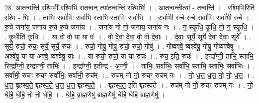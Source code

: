 \documentclass[17pt]{extarticle}
\begin{document}
28. आ॒त॒न्वन्ति॑ र॒श्मिभी॑ र॒श्मिभि॑ रात॒न्वन् त्या॑त॒न्वन्ति॑ र॒श्मिभिः॑ । . आ॒त॒न्वन्तीत्या᳚ - त॒न्वन्ति॑ । . र॒श्मिभि॒रिति॑ र॒श्मि - भिः॒ । . ताभिः॒ सर्वा॑भिः॒ सर्वा॑भि॒ स्ताभि॒ स्ताभिः॒ सर्वा॑भिः । . सर्वा॑भी रु॒चे रु॒चे सर्वा॑भिः॒ सर्वा॑भी रु॒चे । . रु॒चे जना॑य॒ जना॑य रु॒चे रु॒चे जना॑य । . जना॑य नो नो॒ जना॑य॒ जना॑य नः । . न॒ स्कृ॒धि॒ कृ॒धि॒ नो॒ न॒ स्कृ॒धि॒ । . कृ॒धीति॑ कृधि । . या वो॑ वो॒ या या वः॑ । . वो॒ दे॒वा॒ दे॒वा॒ वो॒ वो॒ दे॒वाः॒ । . दे॒वाः॒ सूर्ये॒ सूर्ये॑ देवा देवाः॒ सूर्ये᳚ । . सूर्ये॒ रुचो॒ रुचः॒ सूर्ये॒ सूर्ये॒ रुचः॑ । . रुचो॒ गोषु॒ गोषु॒ रुचो॒ रुचो॒ गोषु॑ । . गोष्वश्वे॒ ष्वश्वे॑षु॒ गोषु॒ गोष्वश्वे॑षु । . अश्वे॑षु॒ या या अश्वे॒ ष्वश्वे॑षु॒ याः । . या रुचो॒ रुचो॒ या या रुचः॑ । . रुच॒ इति॒ रुचः॑ । . इन्द्रा᳚ग्नी॒ ताभि॒ स्ताभि॒ रिन्द्रा᳚ग्नी॒ इन्द्रा᳚ग्नी॒ ताभिः॑ । . इन्द्रा᳚ग्नी॒ इतीन्द्र॑ - अ॒ग्नी॒ । . ताभिः॒ सर्वा॑भिः॒ सर्वा॑भि॒ स्ताभि॒ स्ताभिः॒ सर्वा॑भिः । . सर्वा॑भी॒ रुचꣳ॒॒ रुचꣳ॒॒ सर्वा॑भिः॒ सर्वा॑भी॒ रुच᳚म् । . रुच॑म् नो नो॒ रुचꣳ॒॒ रुच॑म् नः । . नो॒ ध॒त्त॒ ध॒त्त॒ नो॒ नो॒ ध॒त्त॒ । . ध॒त्त॒ बृ॒ह॒स्प॒ते॒ बृ॒ह॒स्प॒ते॒ ध॒त्त॒ ध॒त्त॒ बृ॒ह॒स्प॒ते॒ । . बृ॒ह॒स्प॒त॒ इति॑ बृहस्पते । . रुच॑म् नो नो॒ रुचꣳ॒॒ रुच॑म् नः । . नो॒ धे॒हि॒ धे॒हि॒ नो॒ नो॒ धे॒हि॒ । . धे॒हि॒ ब्रा॒ह्म॒णेषु॑ ब्राह्म॒णेषु॑ धेहि धेहि ब्राह्म॒णेषु॑ । \newline
\end{document}
